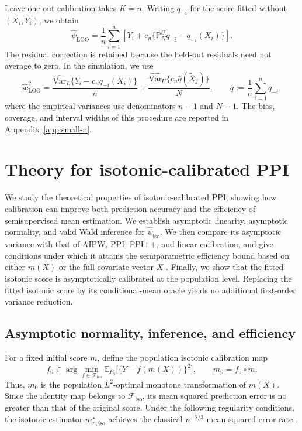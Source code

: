 \documentclass{article}
\theoremstyle{plain}
\theoremstyle{definition}
\newcommand{\E}{\mathbb{E}}
\newcommand{\Var}{\mathrm{Var}}
\newcommand{\1}{\mathbbm{1}}
\newcommand{\mhat}{m}
\newcommand{\Pu}{\mathbb{P}^{U}_N}
\begin{document}
Leave-one-out calibration takes \(K=n\). Writing \(q_{-i}\) for the score
fitted without \((X_i,Y_i)\), we obtain
\begin{equation}
\label{eq:calibration-loo}
\widehat\psi_{\mathrm{LOO}}
=\frac1n\sum_{i=1}^n
\left[Y_i+c_n\{\Pu q_{-i}-q_{-i}(X_i)\}\right].
\end{equation}
The residual correction is retained because the held-out residuals need not
average to zero. In the simulation, we use
\begin{equation}
\label{eq:loo-se}
\widehat{\mathrm{se}}_{\mathrm{LOO}}^2
=\frac{\widehat{\Var}_L\{Y_i-c_nq_{-i}(X_i)\}}{n}
+\frac{\widehat{\Var}_U\{c_n\bar q(\widetilde X_j)\}}{N},
\qquad \bar q:=\frac1n\sum_{i=1}^n q_{-i},
\end{equation}
where the empirical variances use denominators \(n-1\) and \(N-1\).
The bias, coverage, and interval widths of this procedure are reported in
Appendix~\ref{app:small-n}.

\section{Theory for isotonic-calibrated PPI}
\label{sec:theory}

We study the theoretical properties of isotonic-calibrated PPI,
showing how calibration can improve both prediction accuracy and
the efficiency of semisupervised mean estimation. We establish
asymptotic linearity, asymptotic normality, and valid Wald
inference for $\widehat{\psi}_{\mathrm{iso}}$. We then compare
its asymptotic variance with that of AIPW, PPI, PPI++, and
linear calibration, and give conditions under which it attains
the semiparametric efficiency bound based on either $m(X)$
or the full covariate vector $X$
\citep{bickel1993efficient,van2000asymptotic}.
Finally, we show that the fitted isotonic score is
asymptotically calibrated at the population level.
Replacing the fitted isotonic score by its conditional-mean
oracle yields no additional first-order variance reduction.

\subsection{Asymptotic normality, inference, and efficiency}

For a fixed initial score $\mhat$, define the population isotonic
calibration map
\begin{equation}
\label{eq:pop-iso}
f_0 \in \arg\min_{f\in\mathcal F_{\mathrm{iso}}}
\E_{P_0}\bigl[\{Y-f(\mhat(X))\}^2\bigr],
\qquad
m_0 = f_0 \circ \mhat.
\end{equation}
Thus, $m_0$ is the population $L^2$-optimal monotone
transformation of $\mhat(X)$. Since the identity map belongs
to $\mathcal F_{\mathrm{iso}}$, its mean squared prediction
error is no greater than that of the original score.
Under the following regularity conditions, the isotonic
estimator $m_{n,\mathrm{iso}}^\star$ achieves the classical
$n^{-2/3}$ mean squared error rate
\citep{chatterjee2015risk,yang2018contraction}.
\end{document}
